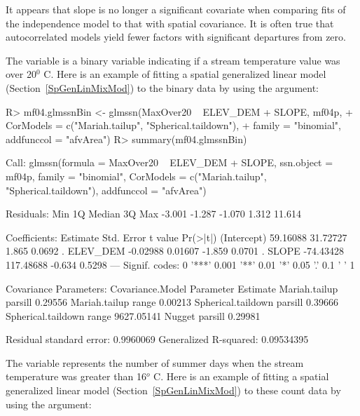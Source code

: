 \documentclass[nojss]{jss}
\renewenvironment{Schunk}{\vspace{\topsep}}{\vspace{\topsep}}
\begin{document}
It appears that slope is no longer a significant covariate when
comparing fits of the independence model to that with spatial
covariance.  It is often true that autocorrelated models yield fewer
factors with significant departures from zero.

The variable  is a binary variable indicating if a
stream temperature value was over 20$^0$ C.  Here is an example of
fitting a spatial generalized linear model
(Section~\ref{SpGenLinMixMod}) to the binary data by using the
 argument:

\begin{Schunk}
\begin{Sinput}
R> mf04.glmssnBin <- glmssn(MaxOver20 ~ ELEV_DEM + SLOPE, mf04p,
+    CorModels = c("Mariah.tailup", "Spherical.taildown"),
+    family = "binomial", addfunccol = "afvArea")
R> summary(mf04.glmssnBin)
\end{Sinput}
\begin{Soutput}
Call:
glmssn(formula = MaxOver20 ~ ELEV_DEM + SLOPE, ssn.object = mf04p, 
    family = "binomial", CorModels = c("Mariah.tailup", "Spherical.taildown"), 
    addfunccol = "afvArea")

Residuals:
   Min     1Q Median     3Q    Max 
-3.001 -1.287 -1.070  1.312 11.614 

Coefficients:
             Estimate Std. Error t value Pr(>|t|)  
(Intercept)  59.16088   31.72727   1.865   0.0692 .
ELEV_DEM     -0.02988    0.01607  -1.859   0.0701 .
SLOPE       -74.43428  117.48688  -0.634   0.5298  
---
Signif. codes:  0 '***' 0.001 '**' 0.01 '*' 0.05 '.' 0.1 ' ' 1

Covariance Parameters:
   Covariance.Model Parameter   Estimate
      Mariah.tailup   parsill    0.29556
      Mariah.tailup     range    0.00213
 Spherical.taildown   parsill    0.39666
 Spherical.taildown     range 9627.05141
             Nugget   parsill    0.29981

Residual standard error: 0.9960069
Generalized R-squared: 0.09534395
\end{Soutput}
\end{Schunk}

The variable  represents the number of summer days when the
stream temperature was greater than 16$^o$ C.  Here is an example of
fitting a spatial generalized linear model
(Section~\ref{SpGenLinMixMod}) to these count data by using the
 argument:
\end{document}
